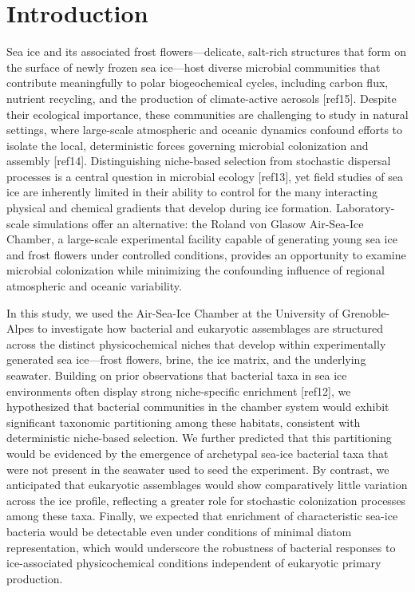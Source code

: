 \documentclass[
  11pt,
]{article}
\begin{document}
\section{Introduction}\label{introduction-1}

Sea ice and its associated frost flowers---delicate, salt-rich
structures that form on the surface of newly frozen sea ice---host
diverse microbial communities that contribute meaningfully to polar
biogeochemical cycles, including carbon flux, nutrient recycling, and
the production of climate-active aerosols {[}ref15{]}. Despite their
ecological importance, these communities are challenging to study in
natural settings, where large-scale atmospheric and oceanic dynamics
confound efforts to isolate the local, deterministic forces governing
microbial colonization and assembly {[}ref14{]}. Distinguishing
niche-based selection from stochastic dispersal processes is a central
question in microbial ecology {[}ref13{]}, yet field studies of sea ice
are inherently limited in their ability to control for the many
interacting physical and chemical gradients that develop during ice
formation. Laboratory-scale simulations offer an alternative: the Roland
von Glasow Air-Sea-Ice Chamber, a large-scale experimental facility
capable of generating young sea ice and frost flowers under controlled
conditions, provides an opportunity to examine microbial colonization
while minimizing the confounding influence of regional atmospheric and
oceanic variability.

In this study, we used the Air-Sea-Ice Chamber at the University of
Grenoble-Alpes to investigate how bacterial and eukaryotic assemblages
are structured across the distinct physicochemical niches that develop
within experimentally generated sea ice---frost flowers, brine, the ice
matrix, and the underlying seawater. Building on prior observations that
bacterial taxa in sea ice environments often display strong
niche-specific enrichment {[}ref12{]}, we hypothesized that bacterial
communities in the chamber system would exhibit significant taxonomic
partitioning among these habitats, consistent with deterministic
niche-based selection. We further predicted that this partitioning would
be evidenced by the emergence of archetypal sea-ice bacterial taxa that
were not present in the seawater used to seed the experiment. By
contrast, we anticipated that eukaryotic assemblages would show
comparatively little variation across the ice profile, reflecting a
greater role for stochastic colonization processes among these taxa.
Finally, we expected that enrichment of characteristic sea-ice bacteria
would be detectable even under conditions of minimal diatom
representation, which would underscore the robustness of bacterial
responses to ice-associated physicochemical conditions independent of
eukaryotic primary production.
\end{document}
